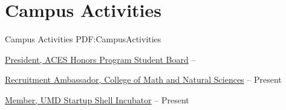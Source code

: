 
\section
{Campus Activities}
{Campus Activities}
{PDF:CampusActivities}

\BulletItem
\href{http://aces.umd.edu/}
{President,
ACES Honors Program Student Board}
\hfill
{} --

\BulletItem
\href{https://cmns.umd.edu/undergraduate/admissions/recruitment-ambassadors}
{Recruitment Ambassador,
College of Math and Natural Sciences}
\hfill
{} --
Present

\GapNoBreak
\BulletItem
\href{http://startupshell.org/}
{Member,
UMD Startup Shell Incubator}
\hfill
{} --
Present
\GapNoBreak
